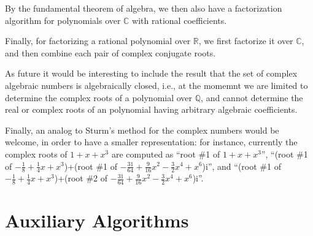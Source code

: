 \documentclass[11pt,a4paper]{article}
\newcommand\rats{\mathbb{Q}}
\newcommand\reals{\mathbb{R}}
\newcommand\complex{\mathbb{C}}
\begin{document}
By the fundamental theorem of algebra, we then also have a factorization algorithm for
polynomials over $\complex$ with rational coefficients.

Finally, for factorizing a rational polynomial over $\reals$, we first factorize it over $\complex$,
and then combine each pair of complex conjugate roots.

\medskip

As future it would be interesting to include the result that the set of complex algebraic numbers is algebraically
closed, i.e., at the momemnt we are limited to determine the complex roots of a polynomial over $\rats$, and
cannot determine the real or complex roots of an polynomial having arbitrary algebraic coefficients.

Finally, an analog to Sturm's method for the complex numbers would be welcome, in order to
have a smaller representation: for instance, currently the complex roots of $1 + x + x^3$ are
computed as ``root \#1 of $1 + x + x^3$'', 
``(root \#1 of $-\frac18 + \frac14x + x^3$)+(root \#1 of $-\frac{31}{64} + \frac{9}{16}x^2 - \frac32x^4 + x^6$)i'', and 
``(root \#1 of $-\frac18 + \frac14x + x^3$)+(root \#2 of $-\frac{31}{64} + \frac{9}{16}x^2 - \frac32x^4 + x^6$)i''.

\section{Auxiliary Algorithms}








\end{document}
